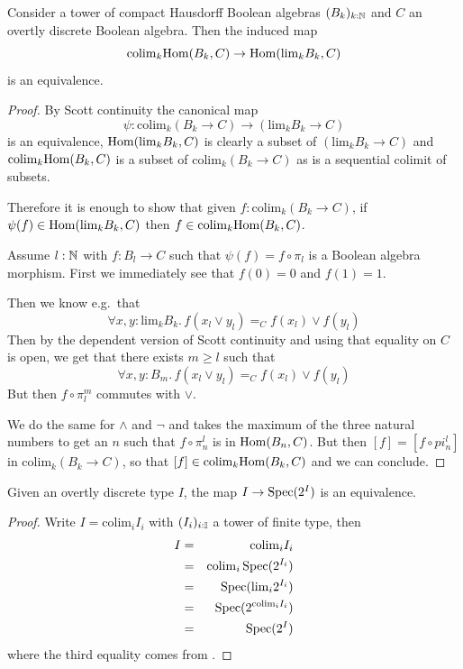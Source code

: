 

\begin{lemma}\label{scott-boolean-algebra}
Consider a tower of compact Hausdorff Boolean algebras $(B_k)_{k:\mathbb{N}}$ and $C$ an overtly discrete Boolean algebra. Then the induced map
\[\mathrm{colim}_k\mathrm{Hom}(B_k,C) \to \mathrm{Hom}(\mathrm{lim}_kB_k,C)\]
is an equivalence.
\end{lemma}

\begin{proof}
By Scott continuity the canonical map
\[\psi : \mathrm{colim}_k(B_k\to C) \to (\mathrm{lim}_kB_k\to C)\]
is an equivalence, $\mathrm{Hom}(\mathrm{lim}_kB_k,C)$ is clearly a subset of $(\mathrm{lim}_kB_k\to C)$ and $\mathrm{colim}_k\mathrm{Hom}(B_k,C)$ is a subset of $\mathrm{colim}_k(B_k\to C)$ as is a sequential colimit of subsets.

Therefore it is enough to show that given $f:\mathrm{colim}_k(B_k\to C)$, if $\psi(f)\in \mathrm{Hom}(\mathrm{lim}_kB_k,C)$ then $f\in \mathrm{colim}_k\mathrm{Hom}(B_k,C)$. 

Assume $l:\mathbb{N}$ with $f:B_l\to C$ such that $\psi(f) = f\circ \pi_l$ is a Boolean algebra morphism. First we immediately see that $f(0)=0$ and $f(1)=1$.

Then we know e.g.\ that
\[\forall x,y:\mathrm{lim}_kB_k.\, f(x_l\lor y_l) =_C f(x_l)\lor f(y_l)\]
Then by the dependent version of Scott continuity and using that equality on $C$ is open, we get that there exists $m\geq l$ such that
\[\forall x,y:B_{m}.\, f(x_l\lor y_l) =_C f(x_l)\lor f(y_l)\]
But then $f\circ \pi^{m}_l$ commutes with $\lor$. 

We do the same for $\land$ and $\neg$ and takes the maximum of the three natural numbers to get an $n$ such that $f\circ \pi_{n}^l$ is in $\mathrm{Hom}(B_n,C)$. But then $[f] = [f\circ pi_{n}^l]$ in $\mathrm{colim}_k(B_k\to C)$, so that $[f]\in \mathrm{colim}_k\mathrm{Hom}(B_k,C)$ and we can conclude.
\end{proof}

\begin{lemma}\label{overtly-discrete-inverse}
Given an overtly discrete type $I$, the map $I\to \operatorname{Spec}(2^I)$ is an equivalence.
\end{lemma}

\begin{proof}
Write $I=\mathrm{colim}_iI_i$ with $(I_i)_{i:\mathbb{I}}$ a tower of finite type, then 
\begin{eqnarray}
I &=& \mathrm{colim}_iI_i\nonumber\\
&=& \mathrm{colim}_i\operatorname{Spec}(2^{I_i})\nonumber\\
&=& \operatorname{Spec}(\mathrm{lim}_i2^{I_i})\nonumber\\
&=& \operatorname{Spec}(2^{\mathrm{colim}_i I_i})\nonumber\\
&=& \operatorname{Spec}(2^I)\nonumber
\end{eqnarray}
where the third equality comes from .
\end{proof}

